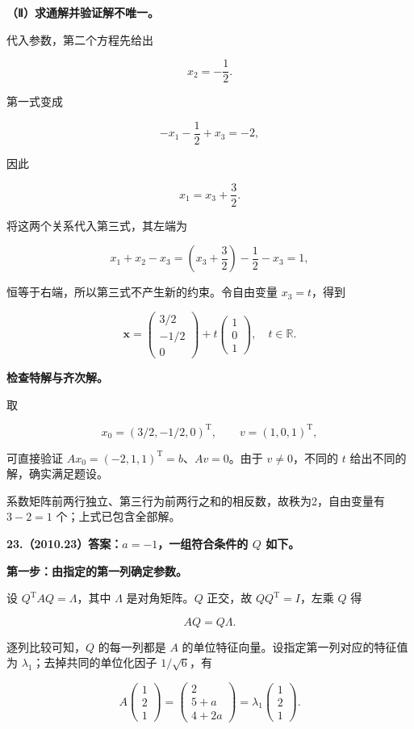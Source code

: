 \documentclass[UTF8,11pt,fontset=windows]{ctexart}
\begin{document}
\textbf{（Ⅱ）求通解并验证解不唯一。}

代入参数，第二个方程先给出

$$
x_2=-\frac12.
$$

第一式变成

$$
-x_1-\frac12+x_3=-2,
$$

因此

$$
x_1=x_3+\frac32.
$$

将这两个关系代入第三式，其左端为

$$
x_1+x_2-x_3
=\left(x_3+\frac32\right)-\frac12-x_3=1,
$$

恒等于右端，所以第三式不产生新的约束。令自由变量 $x_3=t$，得到

$$
\boxed{\boldsymbol x=
\begin{pmatrix}3/2\\-1/2\\0\end{pmatrix}
+t\begin{pmatrix}1\\0\\1\end{pmatrix},\quad t\in\mathbb R}.
$$

\textbf{检查特解与齐次解。}

取

$$
x_0=(3/2,-1/2,0)^{\mathrm T},\qquad v=(1,0,1)^{\mathrm T},
$$

可直接验证 $Ax_0=(-2,1,1)^{\mathrm T}=b$、$Av=0$。由于 $v\ne0$，不同的 $t$ 给出不同的解，确实满足题设。

系数矩阵前两行独立、第三行为前两行之和的相反数，故秩为2，自由变量有 $3-2=1$ 个；上式已包含全部解。

\clearpage

\textbf{23.（2010.23）答案：$a=-1$，一组符合条件的 $Q$ 如下。}

\textbf{第一步：由指定的第一列确定参数。}

设 $Q^{\mathrm T}AQ=\Lambda$，其中 $\Lambda$ 是对角矩阵。$Q$ 正交，故 $QQ^{\mathrm T}=I$，左乘 $Q$ 得

$$
AQ=Q\Lambda.
$$

逐列比较可知，$Q$ 的每一列都是 $A$ 的单位特征向量。设指定第一列对应的特征值为 $\lambda_1$；去掉共同的单位化因子 $1/\sqrt6$，有

$$
A\begin{pmatrix}1\\2\\1\end{pmatrix}
=\begin{pmatrix}2\\5+a\\4+2a\end{pmatrix}
=\lambda_1\begin{pmatrix}1\\2\\1\end{pmatrix}.
$$
\end{document}
